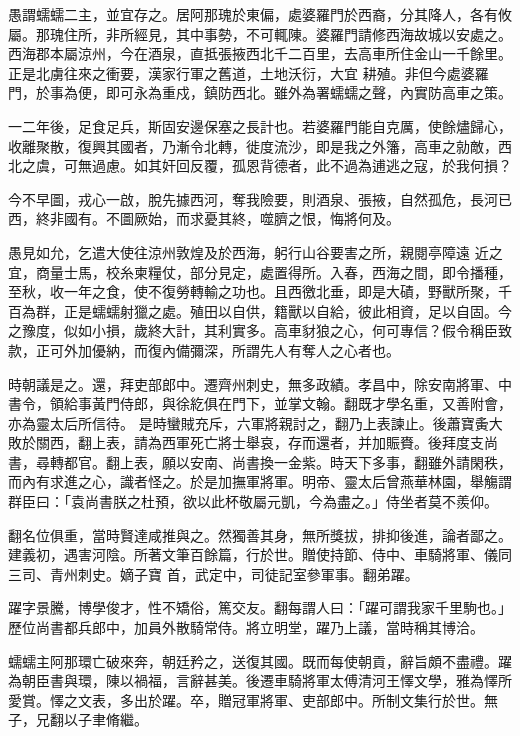 \begin{pinyinscope}
 愚謂蠕蠕二主，並宜存之。居阿那瑰於東偏，處婆羅門於西裔，分其降人，各有攸屬。那瑰住所，非所經見，其中事勢，不可輒陳。婆羅門請修西海故城以安處之。西海郡本屬涼州，今在酒泉，直抵張掖西北千二百里，去高車所住金山一千餘里。正是北虜往來之衝要，漢家行軍之舊道，土地沃衍，大宜
 耕殖。非但今處婆羅門，於事為便，即可永為重戍，鎮防西北。雖外為署蠕蠕之聲，內實防高車之策。



 一二年後，足食足兵，斯固安邊保塞之長計也。若婆羅門能自克厲，使餘燼歸心，收離聚散，復興其國者，乃漸令北轉，徙度流沙，即是我之外籓，高車之勍敵，西北之虞，可無過慮。如其奸回反覆，孤恩背德者，此不過為逋逃之寇，於我何損？



 今不早圖，戎心一啟，脫先據西河，奪我險要，則酒泉、張掖，自然孤危，長河已西，終非國有。不圖厥始，而求憂其終，噬臍之恨，悔將何及。



 愚見如允，乞遣大使往涼州敦煌及於西海，躬行山谷要害之所，親閱亭障遠
 近之宜，商量士馬，校糸柬糧仗，部分見定，處置得所。入春，西海之間，即令播種，至秋，收一年之食，使不復勞轉輸之功也。且西徼北垂，即是大磧，野獸所聚，千百為群，正是蠕蠕射獵之處。殖田以自供，籍獸以自給，彼此相資，足以自固。今之豫度，似如小損，歲終大計，其利實多。高車豺狼之心，何可專信？假令稱臣致款，正可外加優納，而復內備彌深，所謂先人有奪人之心者也。



 時朝議是之。還，拜吏部郎中。遷齊州刺史，無多政績。孝昌中，除安南將軍、中書令，領給事黃門侍郎，與徐紇俱在門下，並掌文翰。翻既才學名重，又善附會，亦為靈太后所信待。
 是時蠻賊充斥，六軍將親討之，翻乃上表諫止。後蕭寶夤大敗於關西，翻上表，請為西軍死亡將士舉哀，存而還者，并加賑賚。後拜度支尚書，尋轉都官。翻上表，願以安南、尚書換一金紫。時天下多事，翻雖外請閑秩，而內有求進之心，識者怪之。於是加撫軍將軍。明帝、靈太后曾燕華林園，舉觴謂群臣曰：「袁尚書朕之杜預，欲以此杯敬屬元凱，今為盡之。」侍坐者莫不羨仰。



 翻名位俱重，當時賢達咸推與之。然獨善其身，無所獎拔，排抑後進，論者鄙之。建義初，遇害河陰。所著文筆百餘篇，行於世。贈使持節、侍中、車騎將軍、儀同三司、青州刺史。嫡子寶
 首，武定中，司徒記室參軍事。翻弟躍。



 躍字景騰，博學俊才，性不矯俗，篤交友。翻每謂人曰：「躍可謂我家千里駒也。」歷位尚書都兵郎中，加員外散騎常侍。將立明堂，躍乃上議，當時稱其博洽。



 蠕蠕主阿那環亡破來奔，朝廷矜之，送復其國。既而每使朝貢，辭旨頗不盡禮。躍為朝臣書與環，陳以禍福，言辭甚美。後遷車騎將軍太傅清河王懌文學，雅為懌所愛賞。懌之文表，多出於躍。卒，贈冠軍將軍、吏部郎中。所制文集行於世。無子，兄翻以子聿脩繼。




\end{pinyinscope}
